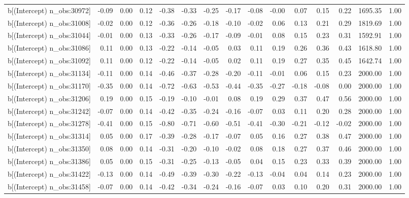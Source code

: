 \begin{table}[ht]
\begin{tabular}{rrrrrrrrrrrrrrr}
  b[(Intercept) n\_obs:30972] & -0.09 & 0.00 & 0.12 & -0.38 & -0.33 & -0.25 & -0.17 & -0.08 & -0.00 & 0.07 & 0.15 & 0.22 & 1695.35 & 1.00 \\ 
  b[(Intercept) n\_obs:31008] & -0.02 & 0.00 & 0.12 & -0.36 & -0.26 & -0.18 & -0.10 & -0.02 & 0.06 & 0.13 & 0.21 & 0.29 & 1819.69 & 1.00 \\ 
  b[(Intercept) n\_obs:31044] & -0.01 & 0.00 & 0.13 & -0.33 & -0.26 & -0.17 & -0.09 & -0.01 & 0.08 & 0.15 & 0.23 & 0.31 & 1592.91 & 1.00 \\ 
  b[(Intercept) n\_obs:31086] & 0.11 & 0.00 & 0.13 & -0.22 & -0.14 & -0.05 & 0.03 & 0.11 & 0.19 & 0.26 & 0.36 & 0.43 & 1618.80 & 1.00 \\ 
  b[(Intercept) n\_obs:31092] & 0.11 & 0.00 & 0.12 & -0.22 & -0.14 & -0.05 & 0.02 & 0.11 & 0.19 & 0.27 & 0.35 & 0.45 & 1642.74 & 1.00 \\ 
  b[(Intercept) n\_obs:31134] & -0.11 & 0.00 & 0.14 & -0.46 & -0.37 & -0.28 & -0.20 & -0.11 & -0.01 & 0.06 & 0.15 & 0.23 & 2000.00 & 1.00 \\ 
  b[(Intercept) n\_obs:31170] & -0.35 & 0.00 & 0.14 & -0.72 & -0.63 & -0.53 & -0.44 & -0.35 & -0.27 & -0.18 & -0.08 & 0.00 & 2000.00 & 1.00 \\ 
  b[(Intercept) n\_obs:31206] & 0.19 & 0.00 & 0.15 & -0.19 & -0.10 & -0.01 & 0.08 & 0.19 & 0.29 & 0.37 & 0.47 & 0.56 & 2000.00 & 1.00 \\ 
  b[(Intercept) n\_obs:31242] & -0.07 & 0.00 & 0.14 & -0.42 & -0.35 & -0.24 & -0.16 & -0.07 & 0.03 & 0.11 & 0.20 & 0.28 & 2000.00 & 1.00 \\ 
  b[(Intercept) n\_obs:31278] & -0.41 & 0.00 & 0.15 & -0.80 & -0.71 & -0.60 & -0.51 & -0.41 & -0.30 & -0.21 & -0.12 & -0.02 & 2000.00 & 1.00 \\ 
  b[(Intercept) n\_obs:31314] & 0.05 & 0.00 & 0.17 & -0.39 & -0.28 & -0.17 & -0.07 & 0.05 & 0.16 & 0.27 & 0.38 & 0.47 & 2000.00 & 1.00 \\ 
  b[(Intercept) n\_obs:31350] & 0.08 & 0.00 & 0.14 & -0.31 & -0.20 & -0.10 & -0.02 & 0.08 & 0.18 & 0.27 & 0.37 & 0.46 & 2000.00 & 1.00 \\ 
  b[(Intercept) n\_obs:31386] & 0.05 & 0.00 & 0.15 & -0.31 & -0.25 & -0.13 & -0.05 & 0.04 & 0.15 & 0.23 & 0.33 & 0.39 & 2000.00 & 1.00 \\ 
  b[(Intercept) n\_obs:31422] & -0.13 & 0.00 & 0.14 & -0.49 & -0.39 & -0.30 & -0.22 & -0.13 & -0.04 & 0.04 & 0.14 & 0.23 & 2000.00 & 1.00 \\ 
  b[(Intercept) n\_obs:31458] & -0.07 & 0.00 & 0.14 & -0.42 & -0.34 & -0.24 & -0.16 & -0.07 & 0.03 & 0.10 & 0.20 & 0.31 & 2000.00 & 1.00 \\ 

\end{tabular}
\end{table}
